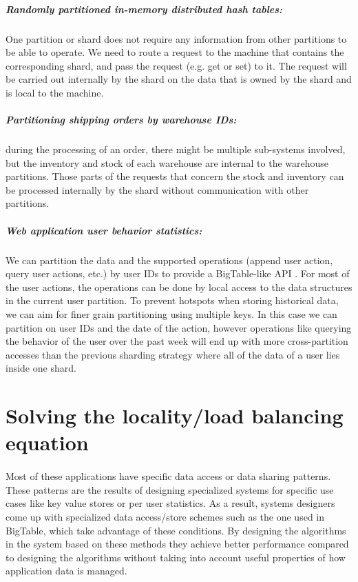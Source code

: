 \subparagraph{Randomly partitioned in-memory distributed hash tables:} One partition or shard
    does not require any information from other partitions to be able to
    operate. We need to route a request to the machine that contains the
    corresponding shard,
    and pass the request (e.g. get or set) to it. The
    request will be carried out internally by the shard on the data that
    is owned by the shard and is local to the machine.

    \subparagraph{Partitioning shipping orders by warehouse IDs:} during the
    processing of an order, there might be multiple sub-systems involved,
    but the inventory and stock of each warehouse are internal to
    the warehouse partitions. Those parts of the requests that concern the
    stock and inventory can be processed internally by the shard without
    communication with other partitions.

    \subparagraph{Web application user behavior statistics:} We can partition
    the data and the supported operations (append user action,
    query user actions, etc.) by user IDs to provide a BigTable-like
    API \cite{chang2008bigtable}.
    For most of
    the user actions, the operations can be done by local access to the
    data structures in the current user partition. To prevent hotspots when
    storing historical data, we can aim for finer grain partitioning using
    multiple keys. In this case we can
    partition on user IDs and the date of the action, however operations like
    querying the behavior of the user over the past
    week will end up with more cross-partition accesses than the previous
    sharding strategy where all of the data of a user lies inside one shard.


\section{Solving the locality/load balancing equation}
\paragraph{}
Most of these applications have specific data access or data sharing patterns.
These patterns are the results of designing specialized systems for specific
use cases like key value stores or per user statistics.
As a result, systems designers come up with specialized data access/store schemes
such as the one used in BigTable, which take advantage of these conditions.
By designing the algorithms
in the system based on these methods they achieve better performance compared
to designing the algorithms without taking into account useful properties of
how application data is managed.

